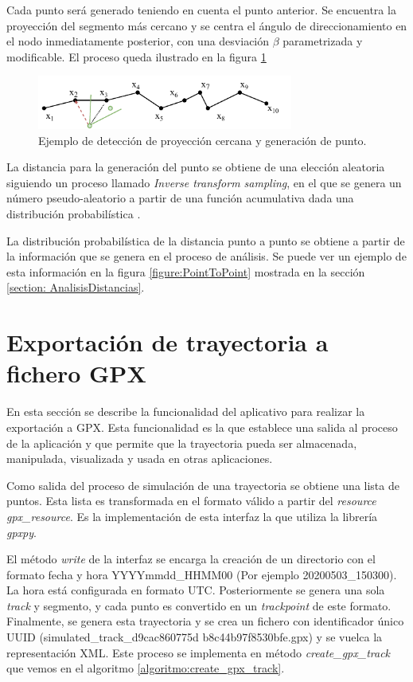 Cada punto será generado teniendo en cuenta el punto anterior. Se encuentra la 
proyección del segmento más cercano y se centra el ángulo de direccionamiento en el 
nodo inmediatamente posterior, con una desviación $\beta$ parametrizada y 
modificable. El proceso queda ilustrado en la figura \ref{figure:PointGeneration02}

\begin{figure}[!htb]
\begin{center}
\includegraphics[width=0.75\textwidth]{./Imagenes/PointGeneration02}
\caption{Ejemplo de detección de proyección cercana y generación de punto.}
\label{figure:PointGeneration02}
\end{center}
\end{figure}

La distancia para la generación del punto se obtiene de una elección aleatoria siguiendo 
un proceso llamado \textit{Inverse transform sampling}, en el que se genera un número 
pseudo-aleatorio a partir de una función acumulativa dada una distribución 
probabilística \cite{Sigman01}.

La distribución probabilística de la distancia punto a punto se obtiene a partir de la 
información que se genera en el proceso de análisis. Se puede ver un ejemplo de esta 
información en la figura \ref{figure:PointToPoint} mostrada en la sección \ref{section: 
AnalisisDistancias}.

\section{Exportación de trayectoria a fichero \ac{GPX}}
En esta sección se describe la funcionalidad del aplicativo para realizar la exportación a 
\ac{GPX}. Esta funcionalidad es la que establece una salida al proceso de la aplicación 
y que permite que la trayectoria pueda ser almacenada, manipulada, visualizada y 
usada en otras aplicaciones.

Como salida del proceso  de simulación de una trayectoria se obtiene una lista de 
puntos. Esta lista es transformada en el formato válido a partir del \textit{resource} 
\textit{gpx\_resource}. Es la implementación de esta interfaz la que utiliza la librería 
\textit{gpxpy}. 

El método \textit{write} de la interfaz se encarga la creación de un directorio con el 
formato fecha y hora YYYYmmdd\_HHMM00 (Por ejemplo 20200503\_150300). La 
hora está configurada en formato \ac{UTC}. Posteriormente se genera una sola 
\textit{track} y segmento, y cada punto es convertido en un \textit{trackpoint} de este 
formato. Finalmente, se genera esta trayectoria y se crea un fichero con identificador 
único \ac{UUID} (simulated\_track\_d9cac860\-775d\- 
b8c4\-4b97f8530bfe.gpx) y se vuelca la representación \ac{XML}. Este proceso se 
implementa en método \textit{create\_gpx\_track} que vemos en el algoritmo 
\ref{algoritmo:create_gpx_track}.


